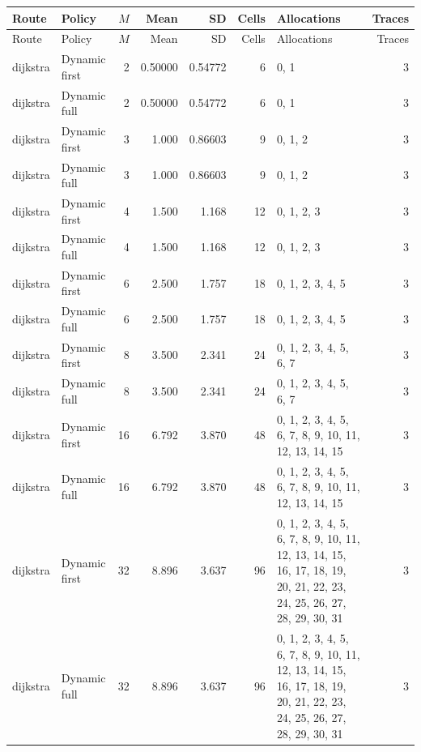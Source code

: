 \documentclass[10pt,a4paper]{article}
\begin{document}
\tiny\setlength{\tabcolsep}{2pt}\begin{longtable}{@{}p{23mm}p{29mm}rrrrp{36mm}r@{}}
\toprule Route & Policy & $M$ & Mean & SD & Cells & Allocations & Traces \\ \midrule\endfirsthead
\toprule Route & Policy & $M$ & Mean & SD & Cells & Allocations & Traces \\ \midrule\endhead
\bottomrule\endfoot
dijkstra & Dynamic first & 2 & 0.50000 & 0.54772 & 6 & 0, 1 & 3 \\
dijkstra & Dynamic full & 2 & 0.50000 & 0.54772 & 6 & 0, 1 & 3 \\
dijkstra & Dynamic first & 3 & 1.000 & 0.86603 & 9 & 0, 1, 2 & 3 \\
dijkstra & Dynamic full & 3 & 1.000 & 0.86603 & 9 & 0, 1, 2 & 3 \\
dijkstra & Dynamic first & 4 & 1.500 & 1.168 & 12 & 0, 1, 2, 3 & 3 \\
dijkstra & Dynamic full & 4 & 1.500 & 1.168 & 12 & 0, 1, 2, 3 & 3 \\
dijkstra & Dynamic first & 6 & 2.500 & 1.757 & 18 & 0, 1, 2, 3, 4, 5 & 3 \\
dijkstra & Dynamic full & 6 & 2.500 & 1.757 & 18 & 0, 1, 2, 3, 4, 5 & 3 \\
dijkstra & Dynamic first & 8 & 3.500 & 2.341 & 24 & 0, 1, 2, 3, 4, 5, 6, 7 & 3 \\
dijkstra & Dynamic full & 8 & 3.500 & 2.341 & 24 & 0, 1, 2, 3, 4, 5, 6, 7 & 3 \\
dijkstra & Dynamic first & 16 & 6.792 & 3.870 & 48 & 0, 1, 2, 3, 4, 5, 6, 7, 8, 9, 10, 11, 12, 13, 14, 15 & 3 \\
dijkstra & Dynamic full & 16 & 6.792 & 3.870 & 48 & 0, 1, 2, 3, 4, 5, 6, 7, 8, 9, 10, 11, 12, 13, 14, 15 & 3 \\
dijkstra & Dynamic first & 32 & 8.896 & 3.637 & 96 & 0, 1, 2, 3, 4, 5, 6, 7, 8, 9, 10, 11, 12, 13, 14, 15, 16, 17, 18, 19, 20, 21, 22, 23, 24, 25, 26, 27, 28, 29, 30, 31 & 3 \\
dijkstra & Dynamic full & 32 & 8.896 & 3.637 & 96 & 0, 1, 2, 3, 4, 5, 6, 7, 8, 9, 10, 11, 12, 13, 14, 15, 16, 17, 18, 19, 20, 21, 22, 23, 24, 25, 26, 27, 28, 29, 30, 31 & 3 \\
\end{longtable}\normalsize\setlength{\tabcolsep}{6pt}
\clearpage
\end{document}
